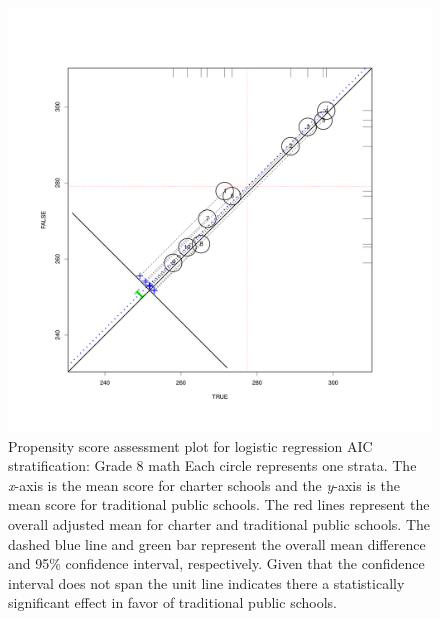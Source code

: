 \begin{figure}
\begin{center}
\includegraphics[trim=0 .7in 0 .7in]{../Figures2009/g8math-circpsa10-AIC.pdf}
\caption[Propensity score assessment plot for logistic regression AIC stratification: Grade 8 math]{Propensity score assessment plot for logistic regression AIC stratification: Grade 8 math Each circle represents one strata. The \textit{x}-axis is the mean score for charter schools and the \textit{y}-axis is the mean score for traditional public schools. The red lines represent the overall adjusted mean for charter and traditional public schools. The dashed blue line and green bar represent the overall mean difference and 95\% confidence interval, respectively. Given that the confidence interval does not span the unit line indicates there a statistically significant effect in favor of traditional public schools.}
\end{center}
\end{figure}

\clearpage



